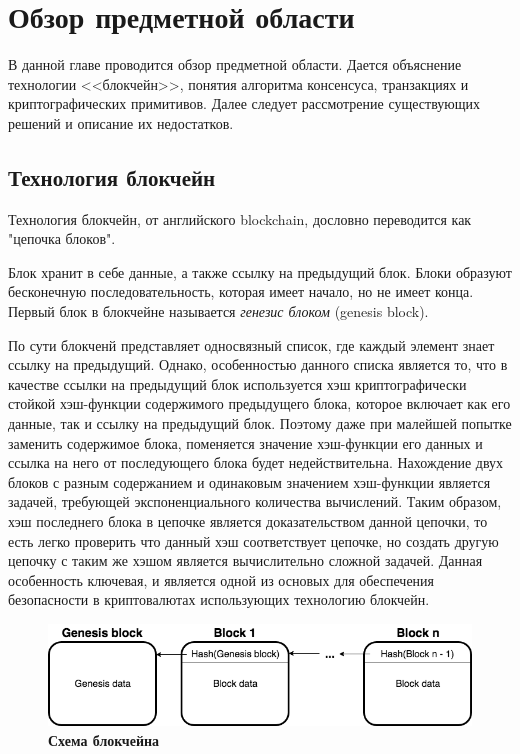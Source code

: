 
\graphicspath{ {images/} }

\startrelatedwork

\chapter{Обзор предметной области} \label{chapter1}
В данной главе проводится обзор предметной области.
Дается объяснение технологии <<блокчейн>>, понятия алгоритма консенсуса, транзакциях и
криптографических примитивов.
Далее следует рассмотрение существующих решений и описание их недостатков.

\section{Технология блокчейн}

Технология блокчейн, от английского blockchain, дословно переводится  как "цепочка блоков".

Блок хранит в себе данные, а также ссылку на предыдущий блок. 
Блоки образуют бесконечную последовательность, которая имеет начало, но не имеет конца.
Первый блок в блокчейне называется \textit{генезис блоком} (genesis block).

По сути блокченй представляет односвязный список, где каждый элемент знает ссылку на предыдущий. 
Однако, особенностью данного списка является то,  что в качестве ссылки на предыдущий блок 
используется хэш криптографически стойкой хэш-функции содержимого предыдущего блока, 
которое включает как его данные, так и ссылку на предыдущий блок. 
Поэтому даже при малейшей попытке заменить содержимое блока, 
поменяется значение хэш-функции его данных и ссылка на него от последующего блока будет недействительна.
Нахождение двух блоков с разным содержанием и одинаковым значением хэш-функции является  задачей, требующей экспоненциального количества вычислений. 
Таким образом, хэш последнего блока в цепочке является доказательством данной цепочки, то есть легко проверить что данный хэш соответствует цепочке, но создать другую цепочку с таким же хэшом является вычислительно сложной задачей. Данная особенность ключевая, и  является одной из основых для обеспечения безопасности в криптовалютах использующих технологию блокчейн.

\begin{figure}[h]
\includegraphics[scale=0.6]{Blockchain_Scheme}
\caption{\textbf{Схема блокчейна}}
\label{fig:blockchain}
\end{figure}


